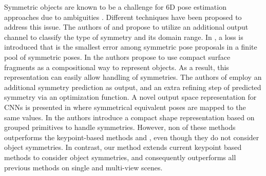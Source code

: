 Symmetric objects are known to be a challenge for 6D pose estimation approaches due to ambiguities \cite{objectSym6D_3DV19}. Different techniques have been proposed to address this issue. The authors of \cite{objectSym6D_3DV19} and \cite{rad2017bb8} propose to utilize an additional output channel to classify the type of symmetry and its domain range. 
In \cite{pix2poseICCV19}, a loss is introduced that is the smallest error among symmetric pose proposals in a finite pool of symmetric poses. 
In \cite{eposCVPR20} the authors propose to use compact surface fragments as a compositional way to represent objects. As a result, this representation can easily allow handling of symmetries. 
The authors of \cite{zhang2020symmetry6d} employ an additional symmetry prediction as output, and an extra refining step of predicted symmetry via an optimization function. 
A novel output space representation for CNNs is presented in  \cite{symCnnICRA21} where symmetrical equivalent poses are mapped to the same values. In \cite{es6d} the authors introduce a compact shape representation based on grouped primitives to handle symmetries.
However, non of these methods outperforms the keypoint-based methods 
\cite{pvn3d} and \cite{ffb6d}, even though they do not consider object symmetries. In contrast, our method extends current keypoint based methods to consider object symmetries, and consequently outperforms all previous methods on single and multi-view scenes.
